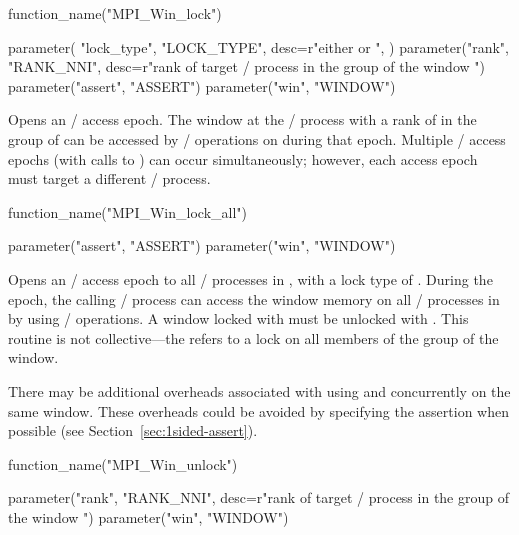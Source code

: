 %
\begin{mpi-binding}
    function_name("MPI_Win_lock")
    
    parameter(
        "lock_type",
        "LOCK_TYPE",
        desc=r"either  or ",
    )
    parameter("rank", "RANK_NNI", desc=r"rank of target \MPI/ process in the group of the window ")
    parameter("assert", "ASSERT")
    parameter("win", "WINDOW")
\end{mpi-binding}

Opens an \RMA/ access epoch.
The
window at the
\mpi/ process with a rank of  in the group of  can be accessed by \RMA/ operations
on  during that
epoch.
Multiple \RMA/ access epochs (with calls to )
can occur simultaneously; however, each access epoch must target a
different \mpi/ process.

%
\begin{mpi-binding}
    function_name("MPI_Win_lock_all")
    
    parameter("assert", "ASSERT")
    parameter("win", "WINDOW")
\end{mpi-binding}

Opens an \RMA/ access epoch to all \mpi/ processes in
, with a lock type of . 
During the epoch, the calling \mpi/ process can access the window memory on all
\mpi/ processes in  by using \RMA/ operations. A window locked with
 must be unlocked with
.  This routine is not collective---the
 refers to a lock on all members of the group of the window.

\begin{users}
There may be additional overheads associated with using
 and  concurrently
on the same window. These overheads could be avoided by specifying the
assertion  when possible (see
Section~\ref{sec:1sided-assert}).
\end{users}

%
\begin{mpi-binding}
    function_name("MPI_Win_unlock")
    
    parameter("rank", "RANK_NNI", desc=r"rank of target \MPI/ process in the group of the window ")
    parameter("win", "WINDOW")
\end{mpi-binding}


